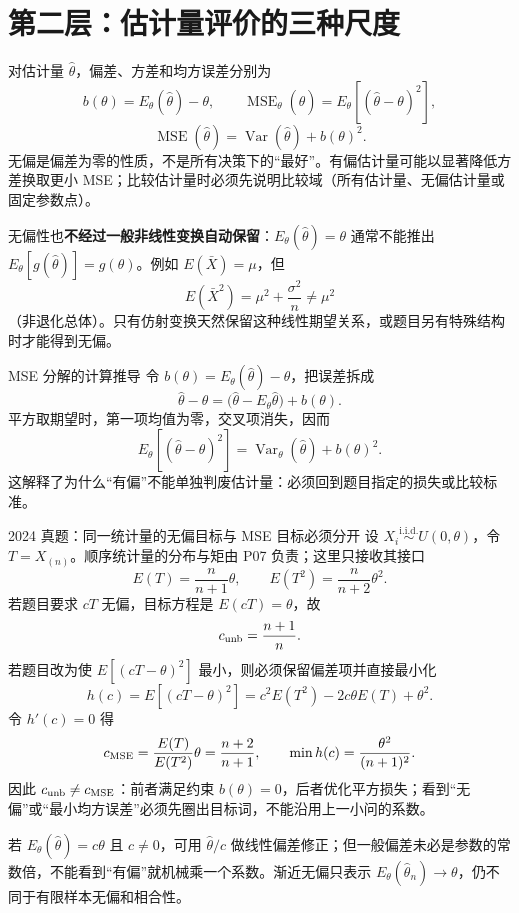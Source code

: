 \documentclass[11pt,a4paper]{ctexart}
\newcommand{\kw}[1]{\textbf{\color{deep}#1}}
\begin{document}
\section{第二层：估计量评价的三种尺度}

对估计量 $\widehat\theta$，偏差、方差和均方误差分别为
\[
b(\theta)=E_\theta(\widehat\theta)-\theta,
\qquad
\operatorname{MSE}_\theta(\widehat\theta)=E_\theta[(\widehat\theta-\theta)^2],
\]
\[
\boxed{\operatorname{MSE}(\widehat\theta)=\operatorname{Var}(\widehat\theta)+b(\theta)^2}.
\]
无偏是偏差为零的性质，不是所有决策下的“最好”。有偏估计量可能以显著降低方差换取更小 MSE；比较估计量时必须先说明比较域（所有估计量、无偏估计量或固定参数点）。

无偏性也\kw{不经过一般非线性变换自动保留}：$E_\theta(\widehat\theta)=\theta$ 通常不能推出 $E_\theta[g(\widehat\theta)]=g(\theta)$。例如 $E(\bar X)=\mu$，但
\[
E(\bar X^2)=\mu^2+\frac{\sigma^2}{n}\ne\mu^2
\]
（非退化总体）。只有仿射变换天然保留这种线性期望关系，或题目另有特殊结构时才能得到无偏。

\begin{methodbox}{MSE 分解的计算推导}
令 $b(\theta)=E_\theta(\widehat\theta)-\theta$，把误差拆成
\[
\widehat\theta-\theta
=\bigl(\widehat\theta-E_\theta\widehat\theta\bigr)+b(\theta).
\]
平方取期望时，第一项均值为零，交叉项消失，因而
\[
E_\theta[(\widehat\theta-\theta)^2]
=\operatorname{Var}_\theta(\widehat\theta)+b(\theta)^2.
\]
这解释了为什么“有偏”不能单独判废估计量：必须回到题目指定的损失或比较标准。
\end{methodbox}

\begin{examplebox}{2024 真题：同一统计量的无偏目标与 MSE 目标必须分开}
设 $X_i\overset{\mathrm{i.i.d.}}\sim U(0,\theta)$，令 $T=X_{(n)}$。顺序统计量的分布与矩由 P07 负责；这里只接收其接口
\[
E(T)=\frac{n}{n+1}\theta,\qquad E(T^2)=\frac{n}{n+2}\theta^2.
\]
若题目要求 $cT$ 无偏，目标方程是 $E(cT)=\theta$，故
\[
c_{\rm unb}=\frac{n+1}{n}.
\]
若题目改为使 $E[(cT-\theta)^2]$ 最小，则必须保留偏差项并直接最小化
\[
h(c)=E[(cT-\theta)^2]
=c^2E(T^2)-2c\theta E(T)+\theta^2.
\]
令 $h'(c)=0$ 得
\[
c_{\rm MSE}=\frac{E(T)}{E(T^2)}\theta
=\frac{n+2}{n+1},\qquad
\min h(c)=\frac{\theta^2}{(n+1)^2}.
\]
因此 $c_{\rm unb}\ne c_{\rm MSE}$：前者满足约束 $b(\theta)=0$，后者优化平方损失；看到“无偏”或“最小均方误差”必须先圈出目标词，不能沿用上一小问的系数。
\end{examplebox}

若 $E_\theta(\widehat\theta)=c\theta$ 且 $c\ne0$，可用 $\widehat\theta/c$ 做线性偏差修正；但一般偏差未必是参数的常数倍，不能看到“有偏”就机械乘一个系数。渐近无偏只表示 $E_\theta(\widehat\theta_n)\to\theta$，仍不同于有限样本无偏和相合性。
\end{document}
